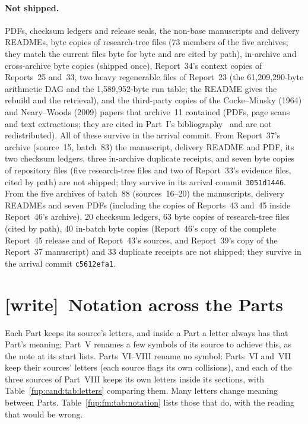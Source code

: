 \documentclass[11pt,letterpaper]{article}
\theoremstyle{definition}\newtheorem{definition}[theorem]{Definition}
\theoremstyle{remark}\newtheorem{remark}[theorem]{Remark}
\newcommand{\wtag}{\textup{[write]}}
\begin{document}
\paragraph{Not shipped.} PDFs, checksum ledgers and release seals, the non-base manuscripts and delivery READMEs, byte copies of research-tree files (73 members of the five archives; they match the current files byte for byte and are cited by path), in-archive and cross-archive byte copies (shipped once), Report~34's context copies of Reports~25 and~33, two heavy regenerable files of Report~23 (the 61,209,290-byte arithmetic DAG and the 1,589,952-byte run table; the README gives the rebuild and the retrieval), and the third-party copies of the Cocke--Minsky (1964) and Neary--Woods (2009) papers that archive~11 contained (PDFs, page scans and text extractions; they are cited in Part~I's bibliography~\cite{fup:gp:NW,fup:gp:CM} and are not redistributed). All of these survive in the arrival commit. From Report~37's archive (source~15, batch~83) the manuscript, delivery README and PDF, its two checksum ledgers, three in-archive duplicate receipts, and seven byte copies of repository files (five research-tree files and two of Report~33's evidence files, cited by path) are not shipped; they survive in its arrival commit \texttt{3051d1446}. From the five archives of batch~88 (sources~16--20) the manuscripts, delivery READMEs and seven PDFs (including the copies of Reports~43 and~45 inside Report~46's archive), 20 checksum ledgers, 63 byte copies of research-tree files (cited by path), 40 in-batch byte copies (Report~46's copy of the complete Report~45 release and of Report~43's sources, and Report~39's copy of the Report~37 manuscript) and 33 duplicate receipts are not shipped; they survive in the arrival commit \texttt{c5612efa1}.

\section{\wtag\ Notation across the Parts}\label{fup:fm:sec:notation}
Each Part keeps its source's letters, and inside a Part a letter always has that Part's meaning; Part~V renames a few symbols of its source to achieve this, as the note at its start lists. Parts~VI--VIII rename no symbol: Parts~VI and~VII keep their sources' letters (each source flags its own collisions), and each of the three sources of Part~VIII keeps its own letters inside its sections, with Table~\ref{fup:cand:tab:letters} comparing them. Many letters change meaning between Parts. Table~\ref{fup:fm:tab:notation} lists those that do, with the reading that would be wrong.
\end{document}
